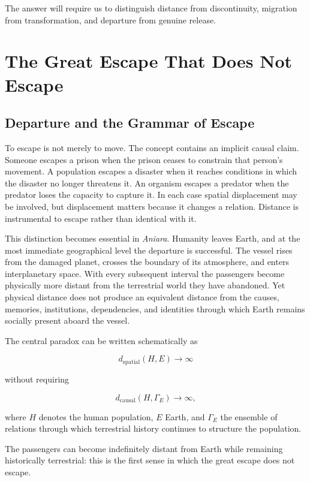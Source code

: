 \documentclass[11pt,oneside]{book}
\theoremstyle{definition}
\theoremstyle{remark}
\begin{document}
The answer will require us to distinguish distance from discontinuity, migration from transformation, and departure from genuine release.

\chapter{The Great Escape That Does Not Escape}

\section{Departure and the Grammar of Escape}

To escape is not merely to move. The concept contains an implicit causal claim. Someone escapes a prison when the prison ceases to constrain that person's movement. A population escapes a disaster when it reaches conditions in which the disaster no longer threatens it. An organism escapes a predator when the predator loses the capacity to capture it. In each case spatial displacement may be involved, but displacement matters because it changes a relation. Distance is instrumental to escape rather than identical with it.

This distinction becomes essential in \emph{Aniara}. Humanity leaves Earth, and at the most immediate geographical level the departure is successful. The vessel rises from the damaged planet, crosses the boundary of its atmosphere, and enters interplanetary space. With every subsequent interval the passengers become physically more distant from the terrestrial world they have abandoned. Yet physical distance does not produce an equivalent distance from the causes, memories, institutions, dependencies, and identities through which Earth remains socially present aboard the vessel.

The central paradox can be written schematically as

\[
d_{\mathrm{spatial}}(H,E)\rightarrow\infty
\]

without requiring

\[
d_{\mathrm{causal}}(H,\Gamma_E)\rightarrow\infty,
\]

where \(H\) denotes the human population, \(E\) Earth, and \(\Gamma_E\) the ensemble of relations through which terrestrial history continues to structure the population.

The passengers can become indefinitely distant from Earth while remaining historically terrestrial: this is the first sense in which the great escape does not escape.
\end{document}

